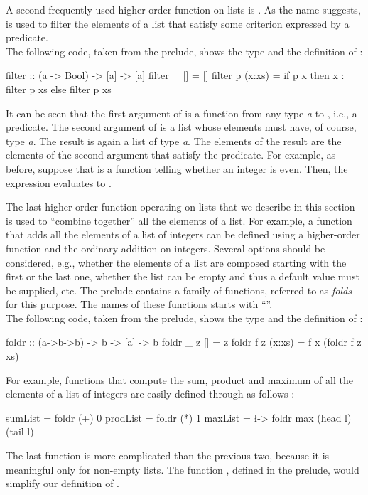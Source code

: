 A second frequently used higher-order function on lists is .
As the name suggests,  is used to filter
the elements of a list that satisfy some criterion
expressed by a predicate.
\\[1ex]
The following code, taken from the prelude, shows
the type and the definition of :
%
\begin{curry}
filter          :: (a -> Bool) -> [a] -> [a]
filter _ []     = []
filter p (x:xs) = if p x then x : filter p xs else filter p xs
\end{curry}
%
It can be seen that the first argument of 
is a function from any type \emph{a} to ,
i.e., a predicate.
The second argument of  is a list whose elements
must have, of course, type \emph{a}.
The result is again a list of type \emph{a}.
The elements of the result are the elements of the second
argument that satisfy the predicate.
For example, as before, suppose that  is a function
telling whether an integer is even.
Then, the expression 
evaluates to \code{[0,2]}.

The last higher-order function operating on lists that
we describe in this section is used to ``combine together''
all the elements of a list.
For example, a function that adds all the elements of
a list of integers can be defined using a higher-order function and
the ordinary addition on integers.
Several options should be considered, e.g., whether the
elements of a list are composed starting with the first or
the last one, whether the list can be empty and thus
a default value must be supplied, etc.
The prelude contains a family of functions, referred to
as \emph{folds} for this purpose. The names of these
functions starts with ``''.
\\[1ex]
The following code, taken from the prelude, shows
the type and the definition of :
%
\begin{curry}
foldr            :: (a->b->b) -> b -> [a] -> b
foldr _ z []     = z
foldr f z (x:xs) = f x (foldr f z xs)
\end{curry}
%
For example, functions that compute the sum, product and maximum
of all the elements of a list of integers are easily defined
through  as follows
:
%
\begin{curry}
sumList  = foldr (+) 0
prodList = foldr (*) 1
maxList  = \l -> foldr max (head l) (tail l)
\end{curry}
%
The last function is more complicated than the previous two,
because it is meaningful only for non-empty lists.
The function , defined in the prelude,
would simplify our definition of .

